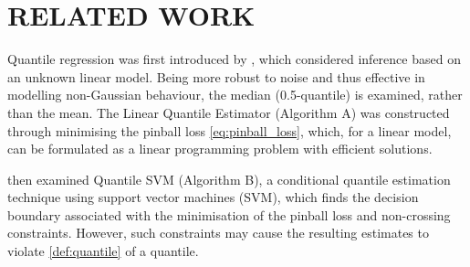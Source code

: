 \documentclass[twoside]{article} \usepackage{aistats2017}
\theoremstyle{definition}
\theoremstyle{theorem}
\begin{document}
\section{RELATED WORK}
\label{sec:related_work}

	Quantile regression was first introduced by \cite{koenker1978regression}, which considered inference based on an unknown linear model. Being more robust to noise and thus effective in modelling non-Gaussian behaviour, the median (0.5-quantile) is examined, rather than the mean. The Linear Quantile Estimator (Algorithm A) was constructed through minimising the pinball loss \eqref{eq:pinball_loss}, which, for a linear model, can be formulated as a linear programming problem with efficient solutions.
	
%	
%	
%	
%	
	\cite{takeuchi2006nonparametric} then examined Quantile SVM (Algorithm B), a conditional quantile estimation technique using support vector machines (SVM), which finds the decision boundary associated with the minimisation of the pinball loss and non-crossing constraints. However, such constraints may cause the resulting estimates to violate \cref{def:quantile} of a quantile.
%	
%	
\end{document}
